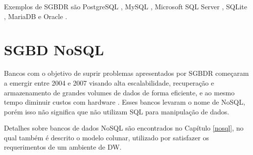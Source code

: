 Exemplos de SGBDR são PostgreSQL \cite{postgres2018r}, MySQL \cite{mysql2018r}, Microsoft SQL Server \cite{microsoft2018r}, SQLite \cite{lite2018r}, MariaDB \cite{maria2018r} e Oracle \cite{oracle2018r}. 

\section{SGBD NoSQL}

Bancos com o objetivo de suprir problemas apresentados por SGBDR começaram a emergir entre 2004 e 2007 visando alta escalabilidade, recuperação e armazenamento de grandes volumes de dados de forma eficiente, e ao mesmo tempo diminuir custos com hardware \cite{han2011nosql}. Esses bancos levaram o nome de NoSQL, porém isso não significa que não utilizam SQL para manipulação de dados.

Detalhes sobre bancos de dados NoSQL são encontrados no Capítulo \ref{nosql}, no qual também é descrito o modelo colunar, utilizado por satisfazer os requerimentos de um ambiente de DW.